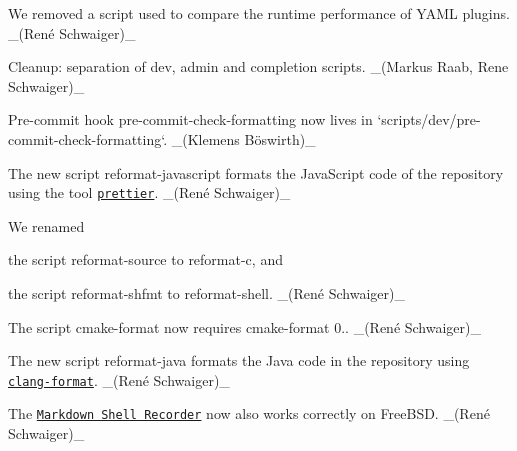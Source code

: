 \begin{DoxyItemize}
\item We removed a script used to compare the runtime performance of Y\+A\+ML plugins. \+\_\+(René Schwaiger)\+\_\+
\item Cleanup\+: separation of dev, admin and completion scripts. \+\_\+(\+Markus Raab, Rene Schwaiger)\+\_\+
\item Pre-\/commit hook {\ttfamily pre-\/commit-\/check-\/formatting} now lives in `scripts/dev/pre-\/commit-\/check-\/formatting`. \+\_\+(Klemens Böswirth)\+\_\+
\item The new script {\ttfamily reformat-\/javascript} formats the Java\+Script code of the repository using the tool \href{https://prettier.io}{\tt {\ttfamily prettier}}. \+\_\+(René Schwaiger)\+\_\+
\item We renamed
\begin{DoxyItemize}
\item the script {\ttfamily reformat-\/source} to {\ttfamily reformat-\/c}, and
\item the script {\ttfamily reformat-\/shfmt} to {\ttfamily reformat-\/shell}. \+\_\+(René Schwaiger)\+\_\+
\end{DoxyItemize}
\item The script cmake-\/format now requires {\ttfamily cmake-\/format} 0.. \+\_\+(René Schwaiger)\+\_\+
\item The new script {\ttfamily reformat-\/java} formats the Java code in the repository using \href{https://clang.llvm.org/docs/ClangFormat.html}{\tt {\ttfamily clang-\/format}}. \+\_\+(René Schwaiger)\+\_\+
\item The \href{https://master.libelektra.org/tests/shell/shell_recorder/tutorial_wrapper}{\tt Markdown Shell Recorder} now also works correctly on Free\+B\+SD. \+\_\+(René Schwaiger)\+\_\+
\end{DoxyItemize}


